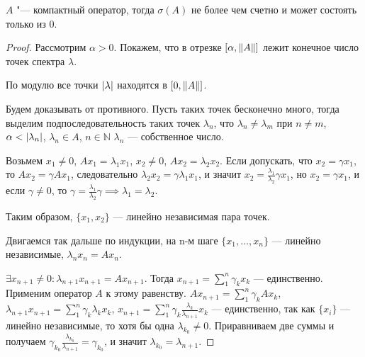 \documentclass{article}
\begin{document}
\begin{theorem}
    $A$ "--- компактный оператор, тогда $\sigma(A)$ не
    более чем счетно и может состоять только из 0.
\end{theorem}
\begin{proof}
    Рассмотрим $\alpha > 0$. Покажем, что в отрезке $[\alpha,  \left\|A\right\|]$ лежит конечное число точек спектра $\lambda$.
    
    По модулю все точки $\left|\lambda\right|$ находятся в $[0, \left\|A\right\|]$.
    


    Будем доказывать от противного. Пусть таких точек бесконечно много, тогда выделим подпоследовательность таких точек $\lambda_{n}$, что $\lambda_{n} \neq \lambda_{m}$ при $n \neq m$, $\alpha < \left|\lambda_{n}\right|$, $\lambda_{n} \in A$, $n \in \mathbb{N}$ $\lambda_{n}$ --- собственное число.
    
    Возьмем $x_{1} \neq 0$, $Ax_{1} = \lambda_{1}x_{1}$, $x_{2} \neq 0$, $Ax_{2} = \lambda_{2}x_{2}$. 
    Если допускать, что $x_{2} = \gamma x_{1}$, то $Ax_{2} = \gamma Ax_{1}$, следовательно $\lambda_{2}x_{2} = \gamma \lambda_{1}x_{1}$, и значит $x_{2} = \frac{\lambda_{1}}{\lambda_{2}} \gamma x_{1}$, но $x_{2} = \gamma x_{1}$, и если $\gamma \neq 0$, то $\gamma = \frac{\lambda_{1}}{\lambda_{2}} \gamma \implies \lambda_{1} = \lambda_{2}$.
    
    Таким образом, $\{x_{1}, x_{2}\}$ --- линейно независимая пара точек.
    
    Двигаемся так дальше по индукции, на n-м шаге $\{x_{1}, \dotso, x_{n}\}$ --- линейно независимые, $\lambda_{n}x_{n} = A x_{n}$. 
    
    $\exists x_{n+1} \neq 0: \lambda_{n+1}x_{n+1} = Ax_{n+1}$. Тогда $x_{n+1} = \sum_{1}^{n}\gamma_k x_k$ --- единственно. Применим оператор $A$ к этому равенству. $Ax_{n+1} = \sum_{1}^{n}\gamma_k Ax_k$, $\lambda_{n+1} x_{n+1} = \sum_{1}^{n}\gamma_k \lambda_k x_k$, $x_{n+1} = \sum_{1}^{n}\gamma_k \frac{\lambda_k}{\lambda_{n+1}} x_k$ --- единственно, так как $\{x_{i}\}$ --- линейно независимые, то хотя бы одна $\lambda_{k_{0}} \neq 0$. Приравниваем две суммы и получаем $\gamma_{k_{0}} \frac{\lambda_{k_{0}}}{\lambda_{n+1}} = \gamma_{k_{0}}$, и значит $\lambda_{k_{0}} = \lambda_{n+1}$.


   

   

\end{proof}
\end{document}
